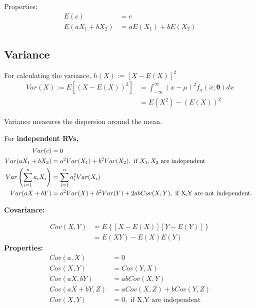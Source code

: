 \documentclass[12pt]{article}
\begin{document}
Properties:
\begin{align*}
E(c)&= c\\
E(aX_1 + bX_2)&= aE(X_1) + bE(X_2)
\end{align*}


\begin{figure}[H]
\end{figure}




\subsection{Variance}
For calculating the variance, $ h(X):= [X - E(X)]^{2} $
\begin{align*}
	Var(X):=E[(X - E(X))^{2}] &= \int_{ - \infty }^{\infty }(x - \mu)^{2}f_{x}(x;\bm{\theta})dx \\
	&= E(X^{2}) - (E(X))^{2}
\end{align*}

Variance measures the dispersion around the mean.

For {\textbf {independent RVs,}}
\begin{align*}
Var(c) &= 0\\
Var(aX_1 + bX_2)&= a^{2}Var(X_1) + b^{2}Var(X_2), \text{ if $ X_1, X_2 $ are independent }\\
Var \left( \sum\limits_{i = 1} ^n a_{i}X_{i}	 \right) &= \sum\limits_{i = 1} ^n a_{i}^{2}Var(X_{i})	\\
Var(aX + bY) &= a^{2}Var(X) + b^{2}Var(Y) + 2abCov(X,Y), \text{ if X,Y are not independent. }
\end{align*}


{\textbf {Covariance:}}

\begin{align*}
		Cov(X,Y) &= E \left\{ \left[ X - E(X) \right] \left[ Y - E(Y) \right]   \right\} \\
		&= E(XY) - E(X)E(Y)
\end{align*}
{\textbf {Properties:}}
\begin{align*}
		Cov(a,X) &= 0\\
		Cov(X,Y) &= Cov(Y,X)\\
		Cov(aX, bY) &= abCov(X,Y)\\
		Cov(aX + bY, Z) &= aCov(X, Z) + bCov(Y,Z)\\
		Cov(X,Y) &= 0, \text{ if X,Y are independent }
\end{align*}
\end{document}
